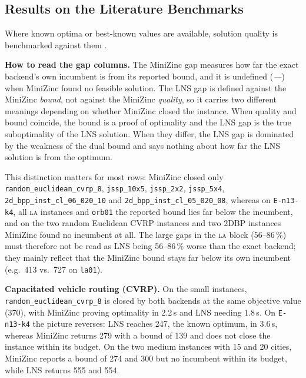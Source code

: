 \documentclass[11pt,a4paper]{article}
\begin{document}
\subsection{Results on the Literature Benchmarks}
Where known optima or best-known values are available, solution quality is benchmarked against them \citep{applegate1991,nowicki1996fast,taillard1993benchmarks,uchoa2017cvrplib,martello1998exact}.

\textbf{How to read the gap columns.}
The MiniZinc gap measures how far the exact backend's own incumbent is from
its reported bound, and it is undefined (\textit{---}) when MiniZinc found no
feasible solution.
The LNS gap is defined against the MiniZinc \emph{bound}, not against the
MiniZinc \emph{quality}, so it carries two different meanings depending on
whether MiniZinc closed the instance.
When quality and bound coincide, the bound is a proof of optimality and the
LNS gap is the true suboptimality of the LNS solution.
When they differ, the LNS gap is dominated by the weakness of the dual bound
and says nothing about how far the LNS solution is from the optimum.

\begin{sloppypar}
This distinction matters for most rows: MiniZinc closed only
\texttt{random\_euclidean\_cvrp\_8}, \texttt{jssp\_10x5},
\texttt{jssp\_2x2}, \texttt{jssp\_5x4},
\texttt{2d\_bpp\_inst\_cl\_06\_020\_10} and
\texttt{2d\_bpp\_inst\_cl\_05\_020\_08},
whereas on \texttt{E-n13-k4}, all \textsc{la} instances and \texttt{orb01}
the reported bound lies far below the incumbent, and on the two random
Euclidean CVRP instances and two 2DBP instances MiniZinc found no incumbent at
all.
The large gaps in the \textsc{la} block (56--86\,\%) must therefore not be
read as LNS being 56--86\,\% worse than the exact backend; they mainly
reflect that the MiniZinc bound stays far below its own incumbent
(e.g.\ 413 vs.\ 727 on \texttt{la01}).
\end{sloppypar}

\begin{sloppypar}
\textbf{Capacitated vehicle routing (CVRP).}
On the small instances, \texttt{random\_euclidean\_cvrp\_8} is closed by both
backends at the same objective value (370), with MiniZinc proving optimality
in 2.2\,s and LNS needing 1.8\,s.
On \texttt{E-n13-k4} the picture reverses: LNS reaches 247, the known
optimum, in 3.6\,s, whereas MiniZinc returns 279 with a bound of 139 and does
not close the instance within its budget.
On the two medium instances with 15 and 20 cities, MiniZinc reports a bound of
274 and 300 but no incumbent within its budget, while LNS returns 555 and 554.
\end{sloppypar}
\end{document}
